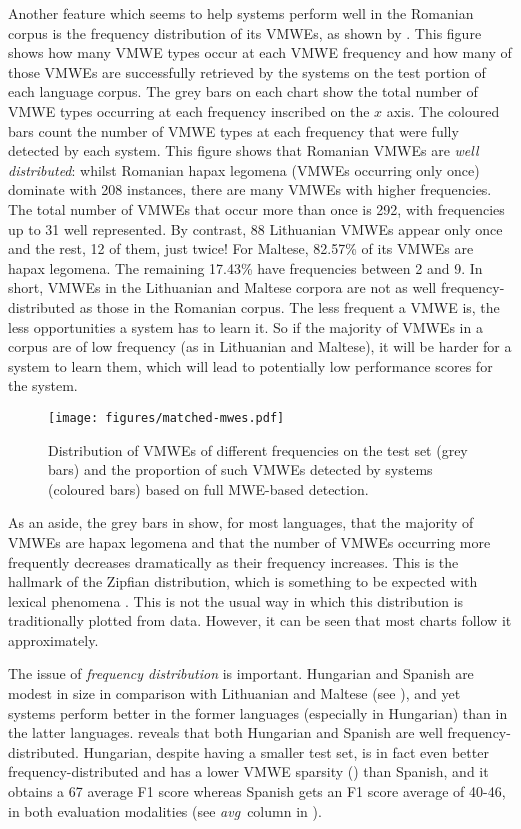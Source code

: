 \documentclass[output=paper
,modfonts
,nonflat,draftmode]{langsci/langscibook}
\begin{document}
Another feature which seems to help systems perform well in the Romanian corpus is the frequency distribution of its VMWEs, as shown by . This figure shows how many VMWE types occur at each VMWE frequency and how many of those VMWEs are successfully retrieved by the systems on the test portion of each language corpus. The grey bars on each chart show the total number of VMWE types occurring at each frequency inscribed on the $x$ axis. The coloured bars count the number of VMWE types at each frequency that were fully detected by each system. This figure shows that Romanian VMWEs are \emph{well distributed}: whilst Romanian hapax legomena (VMWEs occurring only once) dominate with 208 instances, there are many VMWEs with higher frequencies. The total number of VMWEs that occur more than once is 292, with frequencies up to 31 well represented. By contrast, 88 Lithuanian VMWEs appear only once and the rest, 12 of them, just twice! For Maltese, 82.57\% of its VMWEs are hapax legomena. The remaining 17.43\% have frequencies between 2 and 9. In short, VMWEs in the Lithuanian and Maltese corpora are not as well frequency-distributed as those in the Romanian corpus. The less frequent a VMWE is, the less opportunities a system has to learn it. So if the majority of VMWEs in a corpus are of low frequency (as in Lithuanian and Maltese), it will be harder for a system to learn them, which will lead to potentially low performance scores for the system.

\begin{figure}
\texttt{[image: figures/matched-mwes.pdf]}
\caption{\label{fig:matched-mwes}Distribution of VMWEs of different frequencies on the test set (grey bars) and the proportion of such VMWEs detected by systems (coloured bars) based on full MWE-based detection.}
\end{figure}

As an aside, the grey bars in  show, for most languages, that the majority of VMWEs are hapax legomena and that the number of VMWEs occurring more frequently decreases dramatically as their frequency increases. This is the hallmark of the Zipfian distribution, which is something to be expected with lexical phenomena \citep[pp.~22--6]{Manning}. This is not the usual way in which this distribution is traditionally plotted from data. However, it can be seen that most charts follow it approximately.

The issue of \emph{frequency distribution} is important. Hungarian and Spanish are modest in size in comparison with Lithuanian and Maltese (see ), and yet systems perform better in the former languages (especially in Hungarian) than in the latter languages.  reveals that both Hungarian and Spanish are well frequency-distributed. Hungarian, despite having a smaller test set, is in fact even better frequency-distributed and has a lower VMWE sparsity () than Spanish, and it obtains a 67 average F1 score whereas Spanish gets an F1 score average of 40-46, in both evaluation modalities (see \emph{avg}~column in ).
\end{document}
